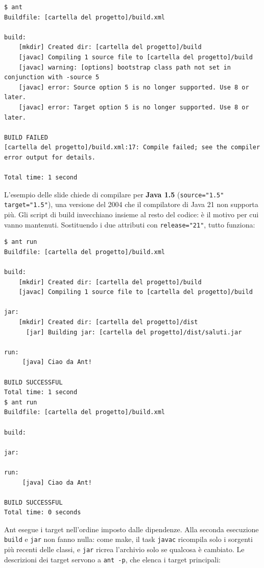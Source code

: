 \begin{lstlisting}[style=shell, name=Terminale]
$ ant
Buildfile: [cartella del progetto]/build.xml

build:
    [mkdir] Created dir: [cartella del progetto]/build
    [javac] Compiling 1 source file to [cartella del progetto]/build
    [javac] warning: [options] bootstrap class path not set in conjunction with -source 5
    [javac] error: Source option 5 is no longer supported. Use 8 or later.
    [javac] error: Target option 5 is no longer supported. Use 8 or later.

BUILD FAILED
[cartella del progetto]/build.xml:17: Compile failed; see the compiler error output for details.

Total time: 1 second
\end{lstlisting}

L'esempio delle slide chiede di compilare per \textbf{Java 1.5} (\texttt{source="1.5" target="1.5"}), una versione del
2004 che il compilatore di Java 21 non supporta più. Gli script di build invecchiano insieme al resto del codice: è il
motivo per cui vanno mantenuti. Sostituendo i due attributi con \texttt{release="21"}, tutto funziona:

\begin{lstlisting}[style=shell, name=Terminale]
$ ant run
Buildfile: [cartella del progetto]/build.xml

build:
    [mkdir] Created dir: [cartella del progetto]/build
    [javac] Compiling 1 source file to [cartella del progetto]/build

jar:
    [mkdir] Created dir: [cartella del progetto]/dist
      [jar] Building jar: [cartella del progetto]/dist/saluti.jar

run:
     [java] Ciao da Ant!

BUILD SUCCESSFUL
Total time: 1 second
$ ant run
Buildfile: [cartella del progetto]/build.xml

build:

jar:

run:
     [java] Ciao da Ant!

BUILD SUCCESSFUL
Total time: 0 seconds
\end{lstlisting}

Ant esegue i target nell'ordine imposto dalle dipendenze. Alla seconda esecuzione \texttt{build} e \texttt{jar} non
fanno nulla: come make, il task \texttt{javac} ricompila solo i sorgenti più recenti delle classi, e \texttt{jar}
ricrea l'archivio solo se qualcosa è cambiato. Le descrizioni dei target servono a \texttt{ant -p}, che elenca i target
principali:

